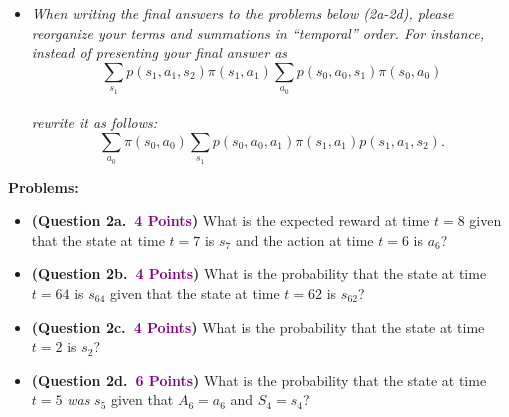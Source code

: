 \documentclass{article}
\newcommand{\POINTS}[1]{\textcolor{purple}{\textbf{{#1}}}}
\begin{document}
\begin{enumerate}
\begin{itemize}
    \item \emph{When writing the final answers to the problems below (2a-2d), please reorganize your terms and summations in ``temporal'' order. For instance, instead of presenting your final answer as
    \\
    $$\sum_{s_1} p(s_1,a_1,s_2) \pi(s_1,a_1) \sum_{a_0} p(s_0,a_0,s_1) \pi(s_0,a_0)$$
    \\
    \textit{rewrite it as follows:}\\
    $$\sum_{a_0} \pi(s_0, a_0) \sum_{s_1} p(s_0,a_0,a_1) \pi(s_1,a_1) p(s_1,a_1,s_2).$$}
    \end{itemize}
    \vspace{0.25cm}
    \textbf{Problems:}

    \begin{itemize} %
        \item \textbf{(Question 2a.~\POINTS{4 Points})} What is the expected reward at time $t=8$ given that the state at time $t=7$ is $s_7$ and the action at time $t=6$ is $a_6$?
        \item \textbf{(Question 2b.~\POINTS{4 Points})} What is the probability that the state at time $t=64$ is $s_{64}$ given that the state at time $t=62$ is $s_{62}$?
        \item \textbf{(Question 2c.~\POINTS{4 Points})} What is the probability that the state at time $t=2$ is $s_{2}$?
        \item \textbf{(Question 2d.~\POINTS{6 Points})} What is the probability that the state at time $t=5$ \textit{was} $s_5$ given that $A_6=a_6$ and $S_4 = s_4$?
    \end{itemize}
    

\end{enumerate}
\end{document}
